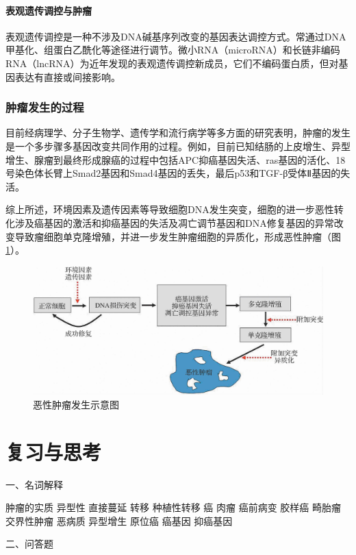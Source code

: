 \paragraph{表观遗传调控与肿瘤}
表观遗传调控是一种不涉及DNA碱基序列改变的基因表达调控方式。常通过DNA甲基化、组蛋白乙酰化等途径进行调节。微小RNA（microRNA）和长链非编码RNA（lncRNA）为近年发现的表观遗传调控新成员，它们不编码蛋白质，但对基因表达有直接或间接影响。

\subsubsection{肿瘤发生的过程}

目前经病理学、分子生物学、遗传学和流行病学等多方面的研究表明，肿瘤的发生是一个多步骤多基因改变共同作用的过程。例如，目前已知结肠的上皮增生、异型增生、腺瘤到最终形成腺癌的过程中包括APC抑癌基因失活、ras基因的活化、18号染色体长臂上Smad2基因和Smad4基因的丢失，最后p53和TGF-β受体Ⅱ基因的失活。

综上所述，环境因素及遗传因素等导致细胞DNA发生突变，细胞的进一步恶性转化涉及癌基因的激活和抑癌基因的失活及凋亡调节基因和DNA修复基因的异常改变导致瘤细胞单克隆增殖，并进一步发生肿瘤细胞的异质化，形成恶性肿瘤（图\ref{fig5-23}）。

\begin{figure}[!htbp]
  \centering
  \includegraphics[scale=1.2]{./images/Image00092.jpg}
  \caption{恶性肿瘤发生示意图}
  \label{fig5-23}
\end{figure}

\section*{复习与思考}

{一、名词解释}

肿瘤的实质 异型性 直接蔓延 转移 种植性转移 癌 肉瘤 癌前病变 胶样癌
畸胎瘤 交界性肿瘤 恶病质 异型增生 原位癌 癌基因 抑癌基因

{二、问答题}


